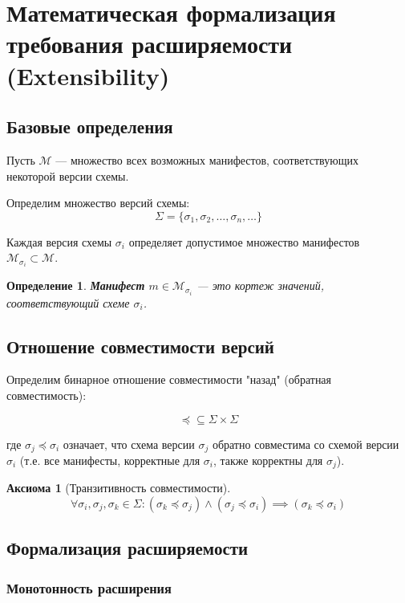 \documentclass{article}
\newtheorem{definition}{Определение}
\newtheorem{axiom}{Аксиома}
\begin{document}
\section{Математическая формализация требования расширяемости (Extensibility)}

\subsection{Базовые определения}

Пусть $\mathcal{M}$ — множество всех возможных манифестов, соответствующих некоторой версии схемы.

Определим множество версий схемы:
\[
\Sigma = \{\sigma_1, \sigma_2, \ldots, \sigma_n, \ldots\}
\]

Каждая версия схемы $\sigma_i$ определяет допустимое множество манифестов $\mathcal{M}_{\sigma_i} \subset \mathcal{M}$.

\begin{definition}
\textbf{Манифест} $m \in \mathcal{M}_{\sigma_i}$ — это кортеж значений, соответствующий схеме $\sigma_i$.
\end{definition}

\subsection{Отношение совместимости версий}

Определим бинарное отношение совместимости "назад" (обратная совместимость):

\[
\preceq \subseteq \Sigma \times \Sigma
\]

где $\sigma_j \preceq \sigma_i$ означает, что схема версии $\sigma_j$ обратно совместима со схемой версии $\sigma_i$ (т.е. все манифесты, корректные для $\sigma_i$, также корректны для $\sigma_j$).

\begin{axiom}[Транзитивность совместимости]
\[
\forall \sigma_i, \sigma_j, \sigma_k \in \Sigma: (\sigma_k \preceq \sigma_j) \land (\sigma_j \preceq \sigma_i) \implies (\sigma_k \preceq \sigma_i)
\]
\end{axiom}

\subsection{Формализация расширяемости}

\subsubsection{Монотонность расширения}
\end{document}
